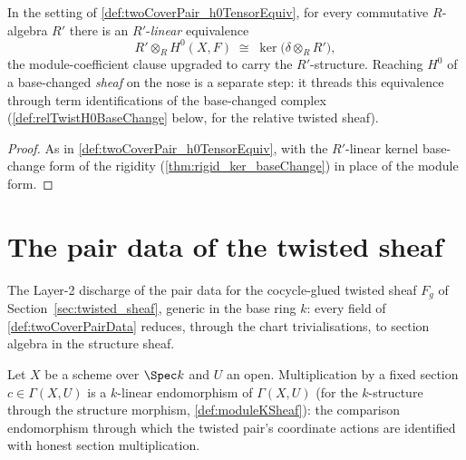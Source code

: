 \begin{definition}
  \label{def:twoCoverPair_h0BaseChangeEquiv}
  \leanok
  In the setting of \ref{def:twoCoverPair_h0TensorEquiv}, for every commutative
  \(R\)-algebra \(R'\) there is an \(R'\)-\emph{linear} equivalence
  \[
    R' \otimes_R H^0(X, F) \;\cong\; \ker\bigl(\delta \otimes_R R'\bigr),
  \]
  the module-coefficient clause upgraded to carry the \(R'\)-structure. Reaching
  \(H^0\) of a base-changed \emph{sheaf} on the nose is a separate step: it threads
  this equivalence through term identifications of the base-changed complex
  (\ref{def:relTwistH0BaseChange} below, for the relative twisted sheaf).
\end{definition}
\begin{proof}
  \leanok
  As in \ref{def:twoCoverPair_h0TensorEquiv}, with the \(R'\)-linear kernel base-change
  form of the rigidity (\ref{thm:rigid_ker_baseChange}) in place of the module form.
\end{proof}

\section{The pair data of the twisted sheaf}
\label{sec:twist_pair_data}

The Layer-2 discharge of the pair data for the cocycle-glued twisted sheaf \(F_g\) of
Section~\ref{sec:twisted_sheaf}, generic in the base ring \(k\): every field of
\ref{def:twoCoverPairData} reduces, through the chart trivialisations, to section
algebra in the structure sheaf.

\begin{definition}
  \label{def:mulSectionEnd}
  \leanok
  Let \(X\) be a scheme over \(\Spec k\) and \(U\) an open. Multiplication by a fixed
  section \(c \in \Gamma(X, U)\) is a \(k\)-linear endomorphism of \(\Gamma(X, U)\)
  (for the \(k\)-structure through the structure morphism, \ref{def:moduleKSheaf}):
  the comparison endomorphism through which the twisted pair's coordinate actions are
  identified with honest section multiplication.
\end{definition}

